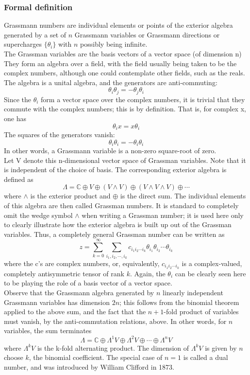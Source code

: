 \subsubsection{Formal definition}
Grassmann numbers are individual elements or points of the exterior algebra generated by a set of $n$ Grassmann variables or Grassmann directions or supercharges $\{\theta _{i}\}$ with $n$ possibly being infinite.
\\
The Grassman variables are the basis vectors of a vector space (of dimension n) They form an algebra over a field, with the field usually being taken to be the complex numbers, although one could contemplate other fields, such as the reals. The algebra is a unital algebra, and the generators are anti-commuting:
\[\theta _{i}\theta _{j}=-\theta _{j}\theta _{i}\]
Since the $\theta _{i}$ form a vector space over the complex numbers, it is trivial that they commute with the complex numbers; this is by definition. That is, for complex x, one has
\[\theta _{i}x=x\theta _{i}\]
The squares of the generators vanish:
\[\theta_i \theta_i = -\theta_i \theta_i\]
In other words, a Grassmann variable is a non-zero square-root of zero.
\\
Let V denote this n-dimensional vector space of Grassman variables. Note that it is independent of the choice of basis. The corresponding exterior algebra is defined as
\[\Lambda =\mathbb {C} \oplus V\oplus \left(V\wedge V\right)\oplus \left(V\wedge V\wedge V\right)\oplus \cdots\]
where $\wedge$ is the exterior product and $\oplus$ is the direct sum. The individual elements of this algebra are then called Grassman numbers. It is standard to completely omit the wedge symbol $\wedge$ when writing a Grassman number; it is used here only to clearly illustrate how the exterior algebra is built up out of the Grassman variables. Thus, a completely general Grassman number can be written as
\[z=\sum _{k=0}^{\infty }\sum _{i_{1},i_{2},\cdots ,i_{k}}c_{i_{1}i_{2}\cdots i_{k}}\theta _{i_{1}}\theta _{i_{2}}\cdots \theta _{i_{k}}\]
where the c's are complex numbers, or, equivalently, $c_{i_{1}i_{2}\cdots i_{k}}$ is a complex-valued, completely antisymmetric tensor of rank $k$. Again, the $\theta _{i}$ can be clearly seen here to be playing the role of a basis vector of a vector space.
\\
Observe that the Grassmann algebra generated by $n$ linearly independent Grassmann variables has dimension $2n$; this follows from the binomial theorem applied to the above sum, and the fact that the $n+1$-fold product of variables must vanish, by the anti-commutation relations, above. In other words, for $n$ variables, the sum terminates
\[\Lambda =\mathbb {C} \oplus \Lambda ^{1}V\oplus \Lambda ^{2}V\oplus \cdots \oplus \Lambda ^{n}V\]
where $\Lambda ^{k}V$ is the k-fold alternating product. The dimension of  $\Lambda ^{k}V$ is given by $n$ choose $k$, the binomial coefficient. The special case of $n=1$ is called a dual number, and was introduced by William Clifford in 1873.

